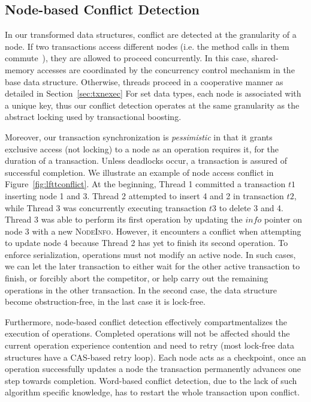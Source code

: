 \documentclass[]{sig-alternate-05-2015}
\begin{document}
\subsection{Node-based Conflict Detection}
In our transformed data structures, conflict are detected at the granularity of a node. 
If two transactions access different nodes (i.e. the method calls in them commute~\cite{herlihy2008transactional}), they are allowed to proceed concurrently. 
In this case, shared-memory accesses are coordinated by the concurrency control mechanism in the base data structure.
Otherwise, threads proceed in a cooperative manner as detailed in Section~\ref{sec:txnexec}
For set data types, each node is associated with a unique key, thus our conflict detection operates at the same granularity as the abstract locking used by transactional boosting.

Moreover, our transaction synchronization is \emph{pessimistic} in that it grants exclusive access (not locking) to a node as an operation requires it, for the duration of a transaction. 
Unless deadlocks occur, a transaction is assured of successful completion.
We illustrate an example of node access conflict in Figure~\ref{fig:lfttconflict}.
At the beginning, Thread 1 committed a transaction $t1$ inserting node 1 and 3. 
Thread 2 attempted to insert 4 and 2 in transaction $t2$, while Thread 3 was concurrently executing transaction $t3$ to delete 3 and 4.
Thread 3 was able to perform its first operation by updating the $info$ pointer on node 3 with a new \textsc{NodeInfo}.
However, it encounters a conflict when attempting to update node 4 because Thread 2 has yet to finish its second operation.
To enforce serialization, operations must not modify an active node. 
In such cases, we can let the later transaction to either wait for the other active transaction to finish, or forcibly abort the competitor, or help carry out the remaining operations in the other transaction.
In the second case, the data structure become obstruction-free, in the last case it is lock-free.

Furthermore, node-based conflict detection effectively compartmentalizes the execution of operations.
Completed operations will not be affected should the current operation experience contention and need to retry (most lock-free data structures have a CAS-based retry loop). 
Each node acts as a checkpoint, once an operation successfully updates a node the transaction permanently advances one step towards completion.
Word-based conflict detection, due to the lack of such algorithm specific knowledge, has to restart the whole transaction upon conflict. 
\end{document}
